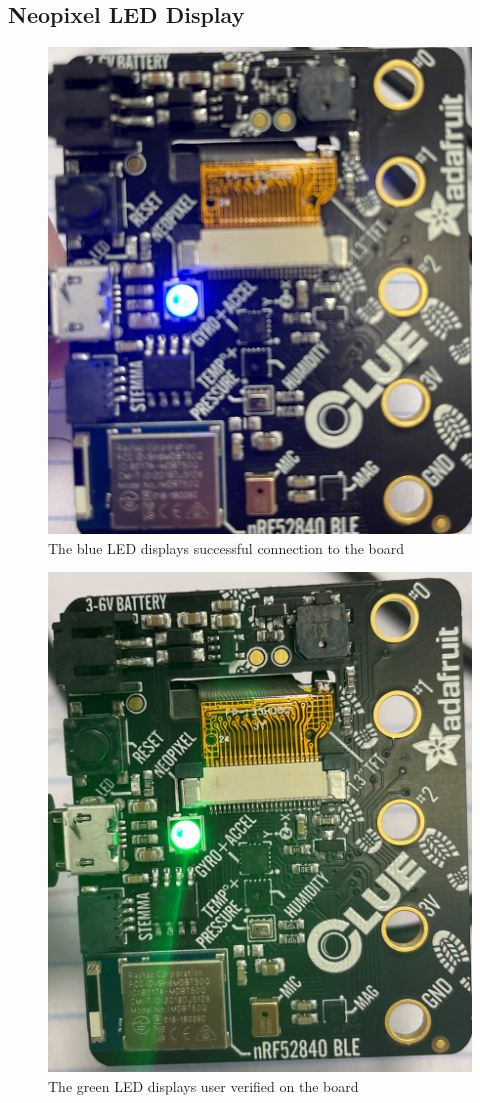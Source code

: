 \documentclass[12pt]{article}
\begin{document}
\subsection{Neopixel LED Display}
\begin{figure}[H]
\centering
\includegraphics[width=4.5in]{blue.jpg}
\caption{The blue LED displays successful connection to the board}
\label{fig:blue}
\end{figure}

\begin{figure}[H]
\centering
\includegraphics[width=4.5in]{green.jpg}
\caption{The green LED displays user verified on the board}
\label{fig:green}
\end{figure}
\end{document}
